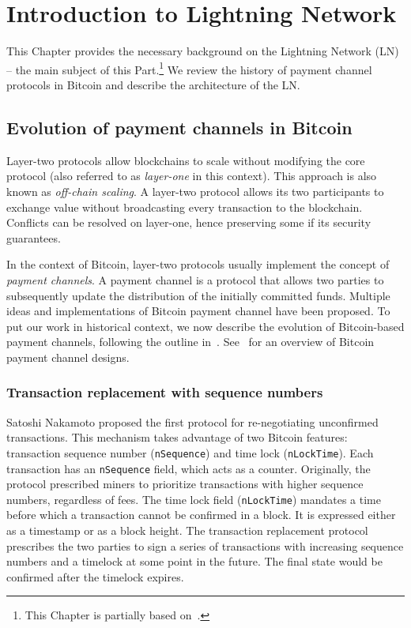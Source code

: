 \chapter{Introduction to Lightning Network}

\label{Chapter05IntroLightning}

This Chapter provides the necessary background on the Lightning Network (LN) -- the main subject of this Part.\footnote{This Chapter is partially based on~\cite{Tikhomirov2020a}.}
We review the history of payment channel protocols in Bitcoin and describe the architecture of the LN.


\section{Evolution of payment channels in Bitcoin}

Layer-two protocols allow blockchains to scale without modifying the core protocol (also referred to as \textit{layer-one} in this context).
This approach is also known as \textit{off-chain scaling}.
A layer-two protocol allows its two participants to exchange value without broadcasting every transaction to the blockchain.
Conflicts can be resolved on layer-one, hence preserving some if its security guarantees.

In the context of Bitcoin, layer-two protocols usually implement the concept of \textit{payment channels}.
A payment channel is a protocol that allows two parties to subsequently update the distribution of the initially committed funds.
Multiple ideas and implementations of Bitcoin payment channel have been proposed.
To put our work in historical context, we now describe the evolution of Bitcoin-based payment channels, following the outline in~\cite{BitcoinWikiChannels}.
See~\cite{McCorry2016} for an overview of Bitcoin payment channel designs.


\subsection{Transaction replacement with sequence numbers}

Satoshi Nakamoto proposed the first protocol for re-negotiating unconfirmed transactions.
This mechanism takes advantage of two Bitcoin features: transaction sequence number (\texttt{nSequence}) and time lock (\texttt{nLockTime}).
Each transaction has an \texttt{nSequence} field, which acts as a counter.
Originally, the protocol prescribed miners to prioritize transactions with higher sequence numbers, regardless of fees.
The time lock field (\texttt{nLockTime}) mandates a time before which a transaction cannot be confirmed in a block.
It is expressed either as a timestamp or as a block height.
The transaction replacement protocol prescribes the two parties to sign a series of transactions with increasing sequence numbers and a timelock at some point in the future.
The final state would be confirmed after the timelock expires.

